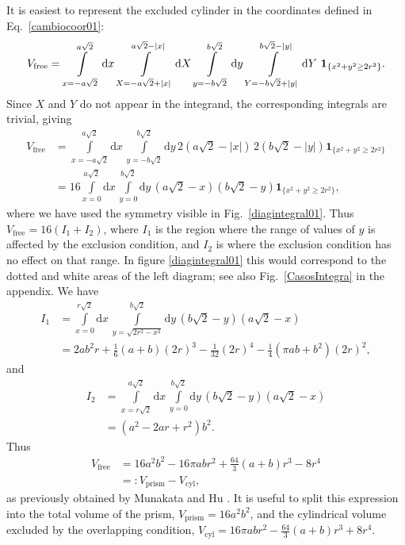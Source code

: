 \documentclass[superscriptaddress,pre,reprint,showpacs,twocolumn]{revtex4-1}
\newcommand{\rd}[1]{\mathrm{d}{#1} \,}
\newcommand{\indicatorsymbol}{\mathbf{1}}
\newcommand{\indicator}[1]{\indicatorsymbol_{ \{   #1 \} } }
\begin{document}
It is easiest to represent the  
excluded cylinder in the coordinates defined in 
Eq.~\eqref{cambiocoor01}:
\begin{equation}\label{integraltotal}
 V_\text{free} = \\ \int\limits_{x=-a \sqrt{2}}^{a \sqrt{2}} \rd x 
\int\limits_{X=-a \sqrt{2} + |x| }^{a \sqrt{2} - |x|}  \rd X
 \int\limits_{y=-b \sqrt{2}}^{b \sqrt{2}} \rd y
\int\limits_{Y=-b \sqrt{2} + |y| }^{b \sqrt{2}-|y|}  \rd Y
\, \indicator{ x^2 + y^2 \ge 2r^2  }.
\end{equation}
Since $X$ and $Y$ do not appear in the integrand, the corresponding integrals are trivial, giving
\begin{align}
 V_\text{free}  &= \int\limits_{x=-a \sqrt{2}}^{a \sqrt{2}} \rd x  \int\limits_{y=-b \sqrt{2}}^{b \sqrt{2}} \rd y
2 \left( a \sqrt{2} - |x| \right) \, 2 \left( b \sqrt{2} - |y| \right) \indicator{ x^2 + y^2 \ge 2r^2 } \\
 &= 16 \int\limits_{x=0}^{a \sqrt{2}} \rd x  \int\limits_{y=0}^{b \sqrt{2}} \rd y 
\left( a \sqrt{2} - x \right) \left( b \sqrt{2} - y \right) \indicator{ x^2 + y^2 \ge 2r^2 },
\end{align}
where we have used the symmetry visible in Fig.~\ref{diagintegral01}.
Thus $V_\text{free} = 16(I_1 + I_2)$, where $I_1$ is the region where the range of values of $y$
is affected by the exclusion condition, and $I_2$ is where the exclusion condition has no effect on that range.
 In figure \ref{diagintegral01} this would correspond to the dotted and
white areas of the left diagram; see also Fig.~\ref{CasosIntegra} in the appendix. 
We have
\begin{align}
 I_1 &= \int\limits_{x=0}^{r\sqrt{2}} \rd x \int\limits_{y = \sqrt{ 2r^2 - x^2}}^{b \sqrt{2}} \rd y
\left( b \sqrt{2} - y \right)  \left( a \sqrt{2} - x \right) \\
&= 	
2 a b^{2} r  + \textstyle \frac{1}{6} (a+b) (2r)^{3} - \frac{1}{32}  (2r)^{4} - \frac{1}{4} {\left(\pi a b + b^{2}\right)} (2r)^2,
\end{align}
and
\begin{align}
 I_2 &= \int\limits_{x=r  \sqrt{2}}^{a \sqrt{2}} \rd x  \int\limits_{y = 0}^{b \sqrt{2}} \rd y
 \left( b \sqrt{2} - y \right)  \left( a \sqrt{2} - x \right)  \\
&=	
{\left( a^{2} - 2ar +   r^{2}\right)} b^{2}.
\end{align}
Thus 
\begin{align}\label{volumeabd}
 V_\text{free}
 & =  16 a^{2} b^{2}  - 16 \pi a b r^{2} + \textstyle \frac{64}{3} (a+b) r^{3}  - 8 r^{4} \\
&=: V_\text{prism} - V_\text{cyl},
\end{align}
as previously obtained by Munakata and Hu \cite{Munakata02}.
It is useful to split this expression into the total volume of the prism, 
$V_\text{prism}=16 a^2 b^2$, and the cylindrical volume excluded by the overlapping
condition, 
$V_\text{cyl} =  16 \pi a b r^{2} - \textstyle \frac{64}{3} (a+b) r^{3}  + 8 r^{4}$.
\end{document}
